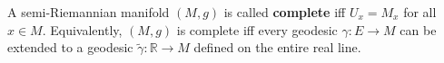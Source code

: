 A semi-Riemannian manifold $(M, g)$ is called \textbf{complete} iff $U_x = M_x$ for all $x \in M$. Equivalently, $(M, g)$ is complete iff every geodesic $\gamma: E \rightarrow M$ can be extended to a geodesic $\tilde{\gamma}: \mathbb{R} \rightarrow M$ defined on the entire real line.
